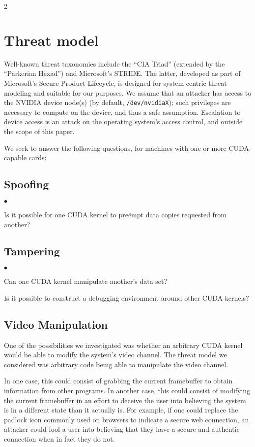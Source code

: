 \documentclass[letterpaper,10pt]{article}
\newcommand{\squishlist}{\begin{list}{$\bullet$}
  {\setlength{\itemsep}{0pt}
    \setlength{\parsep}{3pt}
    \setlength{\topsep}{3pt}
    \setlength{\partopsep}{0pt}
    \setlength{\leftmargin}{1.5em}
    \setlength{\labelwidth}{1em}
    \setlength{\labelsep}{0.5em}
  } }
\newcommand{\squishend}{\end{list}}
\begin{document}
\begin{multicols}{2}
\section{Threat model}
Well-known threat taxonomies include the ``CIA Triad'' (extended by the
``Parkerian Hexad\cite{sechandbook}'') and Microsoft's STRIDE\@. The latter, developed as part of
Microsoft's Secure Product Lifecycle, is designed for system-centric threat
modeling and suitable for our purposes. We assume that an attacker has access
to the NVIDIA device node(s) (by default, \texttt{/dev/nvidiaX}); such privileges
are necessary to compute on the device, and thus a safe assumption. Escalation
to device access is an attack on the operating system's access control, and
outside the scope of this paper.

We seek to answer the following questions, for machines with one or more CUDA-capable
cards:
\subsection{Spoofing}
\squishlist
\item Is it possible for one CUDA kernel to pre\"empt data copies requested
from another?
\squishend
\subsection{Tampering}
\squishlist
\item Can one CUDA kernel manipulate another's data set?
\item Is it possible to construct a debugging environment around other CUDA kernels?
\squishend
\subsection{Video Manipulation}
One of the possibilities we investigated was whether an arbitrary CUDA kernel would be able 
to modify the system's video channel.  The threat model we considered was arbitrary code
being able to manipulate the video channel.  

In one case, this could consist of grabbing the current 
framebuffer to obtain information from other programs.  In another case, this could consist of modifying the 
current framebuffer in an effort to deceive the user into believing the system is in a different state than 
it actually is.  For example, if one could replace the padlock icon
commonly used on browsers to indicate a secure web connection, an attacker could fool a user into believing 
that they have a secure and authentic connection when in fact they do not.


\end{multicols}
\end{document}
